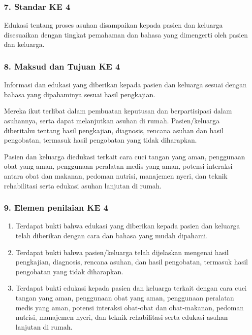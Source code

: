 \documentclass[
]{book}
\providecommand{\tightlist}{%
  \setlength{\itemsep}{0pt}\setlength{\parskip}{0pt}}
\begin{document}
\hypertarget{standar-ke-4}{%
\subsubsection*{7. Standar KE 4}\label{standar-ke-4}}

Edukasi tentang proses asuhan disampaikan kepada pasien dan keluarga disesuaikan dengan tingkat pemahaman dan bahasa yang dimengerti oleh pasien dan keluarga.

\hypertarget{maksud-dan-tujuan-ke-4}{%
\subsubsection*{8. Maksud dan Tujuan KE 4}\label{maksud-dan-tujuan-ke-4}}

Informasi dan edukasi yang diberikan kepada pasien dan keluarga sesuai dengan bahasa yang dipahaminya sesuai hasil pengkajian.

Mereka ikut terlibat dalam pembuatan keputusan dan berpartisipasi dalam asuhannya, serta dapat melanjutkan asuhan di rumah. Pasien/keluarga diberitahu tentang hasil pengkajian, diagnosis, rencana asuhan dan hasil pengobatan, termasuk hasil pengobatan yang tidak diharapkan.

Pasien dan keluarga diedukasi terkait cara cuci tangan yang aman, penggunaan obat yang aman, penggunaan peralatan medis yang aman, potensi interaksi antara obat dan makanan, pedoman nutrisi, manajemen nyeri, dan teknik rehabilitasi serta edukasi asuhan lanjutan di rumah.

\hypertarget{elemen-penilaian-ke-4}{%
\subsubsection*{9. Elemen penilaian KE 4}\label{elemen-penilaian-ke-4}}

\begin{enumerate}
\def\labelenumi{\alph{enumi}.}
\tightlist
\item
  Terdapat bukti bahwa edukasi yang diberikan kepada pasien dan keluarga telah diberikan dengan cara dan bahasa yang mudah dipahami.
\item
  Terdapat bukti bahwa pasien/keluarga telah dijelaskan mengenai hasil pengkajian, diagnosis, rencana asuhan, dan hasil pengobatan, termasuk hasil pengobatan yang tidak diharapkan.
\item
  Terdapat bukti edukasi kepada pasien dan keluarga terkait dengan cara cuci tangan yang aman, penggunaan obat yang aman, penggunaan peralatan medis yang aman, potensi interaksi obat-obat dan obat-makanan, pedoman nutrisi, manajemen nyeri, dan teknik rehabilitasi serta edukasi asuhan lanjutan di rumah.
\end{enumerate}
\end{document}
